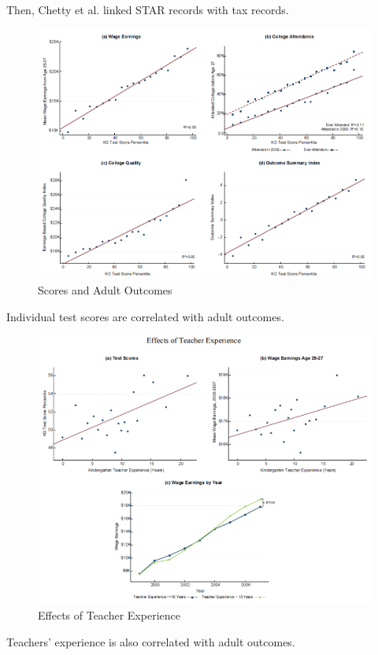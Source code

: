             Then, Chetty et al. linked STAR records with tax records.
            \begin{figure}[H]
                \centering
                \includegraphics[width=4.5in]{images/ch9/9 chetty 2011 1.png}
                \caption{Scores and Adult Outcomes}
            \end{figure}
            Individual test scores are correlated with adult outcomes.
            \begin{figure}[H]
                \centering
                \includegraphics[width=4.5in]{images/ch9/9 chetty 2011 2.png}
                \caption{Effects of Teacher Experience}
            \end{figure}
            Teachers' experience is also correlated with adult outcomes.

